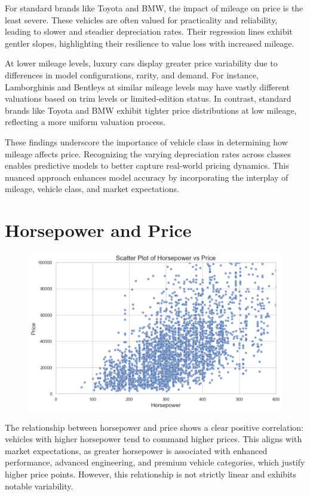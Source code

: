 \documentclass[a4paper,oneside,bibliography=totoc]{scrbook}
\begin{document}
For standard brands like Toyota and BMW, the impact of mileage on price is the least severe. These vehicles are often valued for practicality and reliability, leading to slower and steadier depreciation rates. Their regression lines exhibit gentler slopes, highlighting their resilience to value loss with increased mileage.

At lower mileage levels, luxury cars display greater price variability due to differences in model configurations, rarity, and demand. For instance, Lamborghinis and Bentleys at similar mileage levels may have vastly different valuations based on trim levels or limited-edition status. In contrast, standard brands like Toyota and BMW exhibit tighter price distributions at low mileage, reflecting a more uniform valuation process.

These findings underscore the importance of vehicle class in determining how mileage affects price. Recognizing the varying depreciation rates across classes enables predictive models to better capture real-world pricing dynamics. This nuanced approach enhances model accuracy by incorporating the interplay of mileage, vehicle class, and market expectations.

\section{Horsepower and Price}
\label{sec:horsepowerAndPrice}

\begin{figure}
	\includegraphics[width=\linewidth]{images/horsepower_price.png}
	\centering
\end{figure}

The relationship between horsepower and price shows a clear positive correlation: vehicles with higher horsepower tend to command higher prices. This aligns with market expectations, as greater horsepower is associated with enhanced performance, advanced engineering, and premium vehicle categories, which justify higher price points. However, this relationship is not strictly linear and exhibits notable variability.
\end{document}
